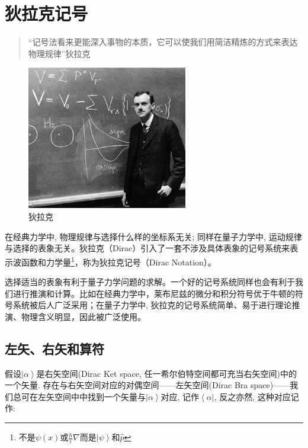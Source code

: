\section{狄拉克记号}

\begin{quotation}
``记号法看来更能深入事物的本质，它可以使我们用简洁精炼的方式来表达物理规律''\qquad 狄拉克
\end{quotation}

\begin{figure}[h]
\begin{center}
\includegraphics[clip,width=7cm]{Notation/dirac.ps}
\caption{狄拉克}
\end{center}
\end{figure}


在经典力学中, 物理规律与选择什么样的坐标系无关; 同样在量子力学中,
运动规律与选择的表象无关。狄拉克（Dirac）引入了一套不涉及具体表象的记号系统来表示波函数和力学量\footnote{不是$\psi(x)$或$\frac{\hbar}{i} \nabla$而是$\left| \psi \right\rangle  $和$\hat p$}，称为狄拉克记号（Dirac Notation）。

选择适当的表象有利于量子力学问题的求解。一个好的记号系统同样也会有利于我们进行推演和计算。比如在经典力学中，莱布尼兹的微分和积分符号优于牛顿的符号系统被后人广泛采用；在量子力学中, 狄拉克的记号系统简单、易于进行理论推演、物理含义明显，因此被广泛使用。

\subsection{左矢、右矢和算符}

假设$\left| \alpha \right\rangle$是右矢空间(Dirac Ket space, 任一希尔伯特空间都可充当右矢空间)中的一个矢量.
存在与右矢空间对应的对偶空间——左矢空间(Dirac Bra space)——我们总可在左矢空间中中找到一个矢量与$\left| \alpha
\right\rangle$对应, 记作$\left\langle  \alpha \right|$, 反之亦然,
这种对应记作:



